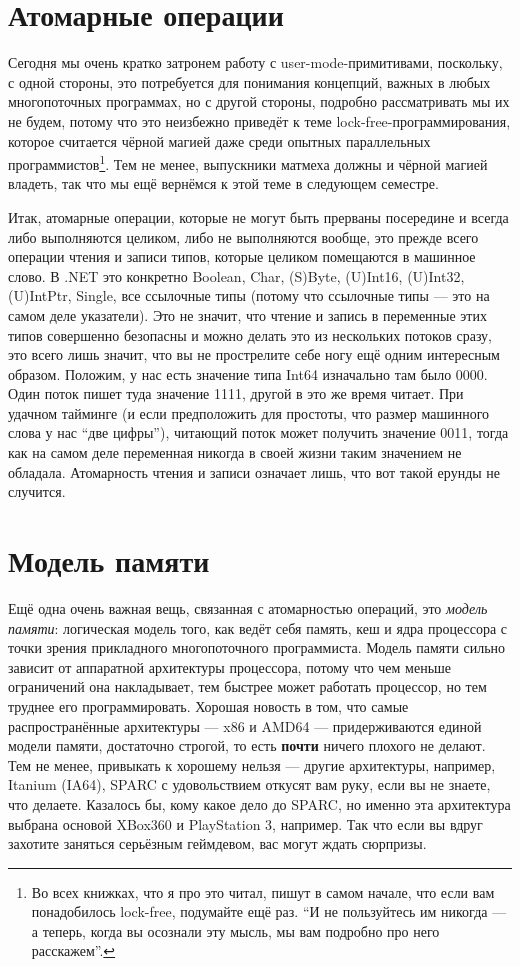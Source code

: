 \documentclass{../../text-style}
\begin{document}
\section{Атомарные операции}

Сегодня мы очень кратко затронем работу с user-mode-примитивами, поскольку, с одной стороны, это потребуется для понимания концепций, важных в любых многопоточных программах, но с другой стороны, подробно рассматривать мы их не будем, потому что это неизбежно приведёт к теме lock-free-программирования, которое считается чёрной магией даже среди опытных параллельных программистов\footnote{Во всех книжках, что я про это читал, пишут в самом начале, что если вам понадобилось lock-free, подумайте ещё раз. \enquote{И не пользуйтесь им никогда --- а теперь, когда вы осознали эту мысль, мы вам подробно про него расскажем}.}. Тем не менее, выпускники матмеха должны и чёрной магией владеть, так что мы ещё вернёмся к этой теме в следующем семестре.

Итак, атомарные операции, которые не могут быть прерваны посередине и всегда либо выполняются целиком, либо не выполняются вообще, это прежде всего операции чтения и записи типов, которые целиком помещаются в машинное слово. В .NET это конкретно Boolean, Char, (S)Byte, (U)Int16, (U)Int32, (U)IntPtr, Single, все ссылочные типы (потому что ссылочные типы --- это на самом деле указатели). Это не значит, что чтение и запись в переменные этих типов совершенно безопасны и можно делать это из нескольких потоков сразу, это всего лишь значит, что вы не прострелите себе ногу ещё одним интересным образом. Положим, у нас есть значение типа Int64 изначально там было 0000. Один поток пишет туда значение 1111, другой в это же время читает. При удачном тайминге (и если предположить для простоты, что размер машинного слова у нас \enquote{две цифры}), читающий поток может получить значение 0011, тогда как на самом деле переменная никогда в своей жизни таким значением не обладала. Атомарность чтения и записи означает лишь, что вот такой ерунды не случится.

\section{Модель памяти}

Ещё одна очень важная вещь, связанная с атомарностью операций, это \textit{модель памяти}: логическая модель того, как ведёт себя память, кеш и ядра процессора с точки зрения прикладного многопоточного программиста. Модель памяти сильно зависит от аппаратной архитектуры процессора, потому что чем меньше ограничений она накладывает, тем быстрее может работать процессор, но тем труднее его программировать. Хорошая новость в том, что самые распространённые архитектуры --- x86 и AMD64 --- придерживаются единой модели памяти, достаточно строгой, то есть \textbf{почти} ничего плохого не делают. Тем не менее, привыкать к хорошему нельзя --- другие архитектуры, например, Itanium (IA64), SPARC с удовольствием откусят вам руку, если вы не знаете, что делаете. Казалось бы, кому какое дело до SPARC, но именно эта архитектура выбрана основой XBox360 и PlayStation 3, например. Так что если вы вдруг захотите заняться серьёзным геймдевом, вас могут ждать сюрпризы.
\end{document}
